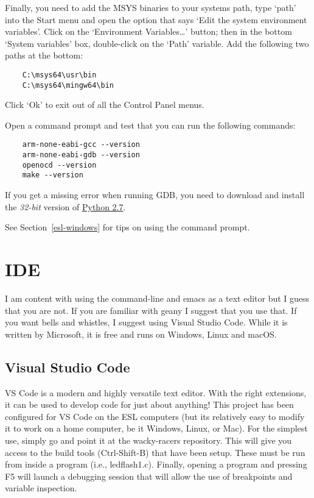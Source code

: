 Finally, you need to add the MSYS binaries to your systems path, type `path'
into the Start menu and open the option that says `Edit the system environment
variables'. Click on the `Environment Variables\ldots' button; then in the
bottom `System variables' box, double-click on the `Path' variable. Add the
following two paths at the bottom:
\begin{verbatim}
    C:\msys64\usr\bin
    C:\msys64\mingw64\bin
\end{verbatim}
Click `Ok' to exit out of all the Control Panel menus.

Open a command prompt and test that you can run the following commands:
\begin{verbatim}
    arm-none-eabi-gcc --version
    arm-none-eabi-gdb --version
    openocd --version
    make --version
\end{verbatim}
If you get a missing  error when running GDB, you need to
download and install the \emph{32-bit} version of
\href{https://www.python.org/downloads/release/python-2718/}{Python 2.7}.

See Section~\ref{esl-windows} for tips on using the command prompt.

\section{IDE}

I am content with using the command-line and emacs as a text editor
but I guess that you are not.  If you are familiar with geany I
suggest that you use that.  If you want bells and whistles, I suggest
using Visual Studio Code.  While it is written by Microsoft, it is
free and runs on Windows, Linux and macOS.


\subsection{Visual Studio Code}

VS Code is a modern and highly versatile text editor.  With the right
extensions, it can be used to develop code for just about anything!
This project has been configured for VS Code on the ESL computers (but
its relatively easy to modify it to work on a home computer, be it
Windows, Linux, or Mac). For the simplest use, simply go  and point it at the wacky-racers repository.  This will
give you access to the build tools (Ctrl-Shift-B) that have been
setup. These must be run from inside a program (i.e., ledflash1.c).
Finally, opening a program and pressing F5 will launch a debugging
session that will allow the use of breakpoints and variable
inspection.

